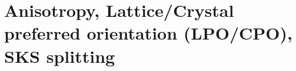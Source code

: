 


\section{Anisotropy, Lattice/Crystal preferred orientation (LPO/CPO), SKS splitting}
\label{sec:topics:anisotropy}

